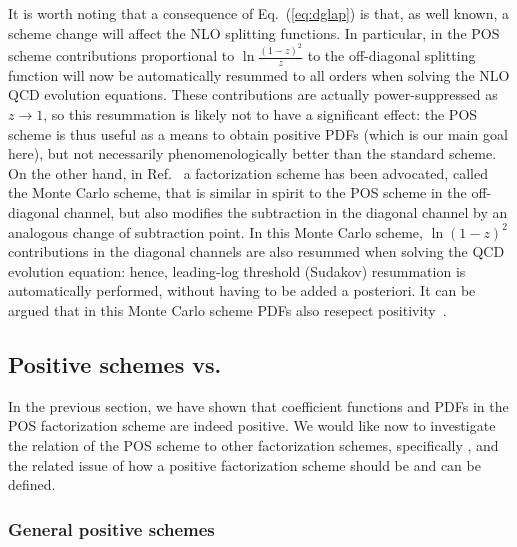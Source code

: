 It is worth noting that a consequence of Eq.~(\ref{eq:dglap}) is that,
as well known, a scheme change will affect the NLO splitting
functions. In particular, in the POS scheme contributions proportional
to $\ln\frac{(1-z)^2}{z}$ to the off-diagonal splitting function will
now be automatically resummed to all orders when solving the NLO QCD
evolution equations. These contributions are actually power-suppressed
as $z\to1$, so this resummation is likely not to have a significant
effect: the POS scheme is thus useful as a means to obtain positive
PDFs (which is our main goal here), but not necessarily
phenomenologically better than the standard \msbar{} scheme. On the
other hand, in Ref.~\cite{Jadach:2016acv} a factorization scheme has
been advocated, called the Monte Carlo scheme, that is similar in
spirit to the POS scheme in the off-diagonal channel, but also
modifies the \msbar{} subtraction in the diagonal channel by an
analogous change of subtraction point. In this Monte Carlo scheme,
$\ln(1-z)^2$ contributions in the diagonal channels are also resummed
when solving the QCD evolution equation: hence, leading-log threshold (Sudakov)
resummation is automatically performed, without having to be added a
posteriori. It can be argued that in this Monte Carlo scheme PDFs also
resepect positivity~\cite{jadprivate}.



\subsection{Positive schemes vs.\ \msbar{}}
\label{sec:gen}

In the previous section, we have shown that coefficient functions and
PDFs in the POS
factorization scheme are indeed positive. We would like now to
investigate the relation of the POS scheme to other factorization
schemes, specifically \msbar{}, and the related issue 
of
how a positive factorization scheme should be and can be defined.

\subsubsection{General positive schemes}
\label{sec:gensch}


